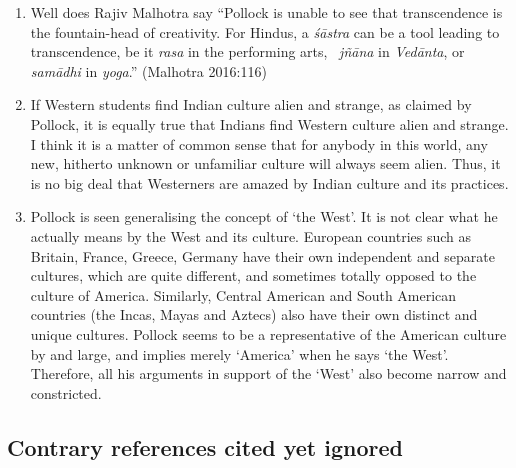 \begin{enumerate}
\item Well does Rajiv Malhotra say ``Pollock is unable to see that transcendence is the fountain-head of creativity. For Hindus, a {\it śāstra} can be a tool leading to transcendence, be it {\it rasa} in the performing arts, \ {\it jñāna} in {\it Vedānta}, or {\it samādhi} in {\it yoga}.'' (Malhotra 2016:116)

\item If Western students find Indian culture alien and strange, as claimed by Pollock, it is equally true that Indians find Western culture alien and strange. I think it is a matter of common sense that for anybody in this world, any new, hitherto unknown or unfamiliar culture will always seem alien. Thus, it is no big deal that Westerners are amazed by Indian culture and its practices.

\item Pollock is seen generalising the concept of `the West'. It is not clear what he actually means by the West and its culture. European countries such as Britain, France, Greece, Germany have their own independent and separate cultures, which are quite different, and sometimes totally opposed to the culture of America. Similarly, Central American and South American countries (the Incas, Mayas and Aztecs) also have their own distinct and unique cultures. Pollock seems to be a representative of the American culture by and large, and implies merely `America' when he says `the West'. Therefore, all his arguments in support of the `West' also become narrow and constricted. 
\end{enumerate}

\subsection*{Contrary references cited yet ignored}

